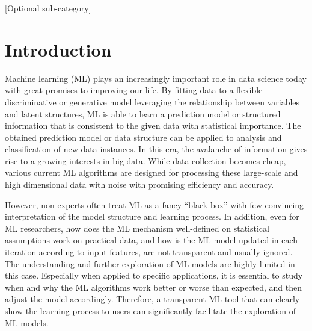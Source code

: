 \documentclass{chi2009}
\begin{document}

[Optional sub-category]

\section{Introduction}

Machine learning (ML) \cite{ML} plays an increasingly important role in data science today with great promises to improving our life. By fitting data to a flexible discriminative or generative model leveraging the relationship between variables and latent structures, ML is able to learn a prediction model or structured information that is consistent to the given data with statistical importance. The obtained prediction model or data structure can be applied to analysis and classification of new data instances. In this era, the avalanche of information gives rise to a growing interests in big data. While data collection becomes cheap, various current ML algorithms are designed for processing these large-scale and high dimensional data with noise with promising efficiency and accuracy. 

However, non-experts often treat ML as a fancy ``black box'' with few convincing interpretation of the model structure and learning process. In addition, even for ML researchers, how does the ML mechanism well-defined on statistical assumptions work on practical data, and how is the ML model updated in each iteration according to input features, are not transparent and usually ignored. The understanding and further exploration of ML models are highly limited in this case. Especially when applied to specific applications, it is essential to study when and why the ML algorithms work better or worse than expected, and then adjust the model accordingly. Therefore, a transparent ML tool that can clearly show the learning process to users can significantly facilitate the exploration of ML models.
\end{document}
